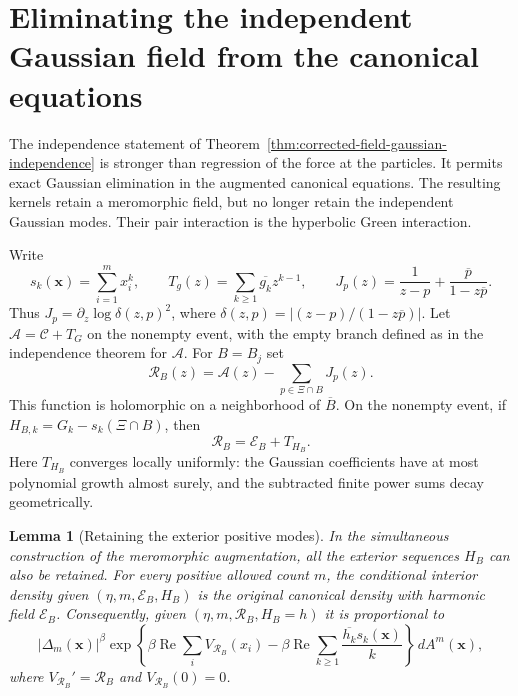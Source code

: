 \documentclass[11pt,a4paper]{article}
\numberwithin{equation}{section}
\newtheorem{lemma}[theorem]{Lemma}
\theoremstyle{definition}
\theoremstyle{remark}
\begin{document}
\section{Eliminating the independent Gaussian field from the canonical equations}
\label{sec:gaussian-elimination-green-specification}

The independence statement of
Theorem~\ref{thm:corrected-field-gaussian-independence} is stronger
than regression of the force at the particles. It permits exact Gaussian
elimination in the augmented canonical equations. The resulting kernels
retain a meromorphic field, but no longer retain the independent Gaussian
modes. Their pair interaction is the hyperbolic Green interaction.

Write
\[
 s_k(\mathbf x)=\sum_{i=1}^m x_i^k,\qquad
 T_g(z)=\sum_{k\ge1}\overline{g_k}z^{k-1},\qquad
 J_p(z)=\frac1{z-p}+\frac{\overline p}{1-z\overline p}.
\]
Thus $J_p=\partial_z\log\delta(z,p)^2$, where
$\delta(z,p)=|(z-p)/(1-z\overline p)|$.
Let $\mathcal A=\mathcal C+T_G$ on the nonempty event, with the empty
branch defined as in the independence theorem for $\mathcal A$.
For $B=B_j$ set
\begin{equation}\label{eq:gaussian-free-exterior-field}
 \mathcal R_B(z)=\mathcal A(z)-\sum_{p\in\Xi\cap B}J_p(z).
\end{equation}
This function is holomorphic on a neighborhood of $\overline B$.
On the nonempty event, if
$H_{B,k}=G_k-s_k(\Xi\cap B)$, then
\begin{equation}\label{eq:R-E-H-identity}
 \mathcal R_B=\mathcal E_B+T_{H_B}.
\end{equation}
Here $T_{H_B}$ converges locally uniformly: the Gaussian coefficients
have at most polynomial growth almost surely, and the subtracted finite
power sums decay geometrically.

\begin{lemma}[Retaining the exterior positive modes]
\label{lem:canonical-retain-exterior-positive-modes}
In the simultaneous construction of the meromorphic augmentation, all
the exterior sequences $H_B$ can also be retained. For every positive
allowed count $m$, the conditional interior density given
$(\eta,m,\mathcal E_B,H_B)$ is the original canonical density with
harmonic field $\mathcal E_B$. Consequently, given
$(\eta,m,\mathcal R_B,H_B=h)$ it is proportional to
\begin{equation}\label{eq:canonical-density-before-gaussian-elimination}
 |\Delta_m(\mathbf x)|^\beta
 \exp\left\{\beta\operatorname{Re}\sum_i V_{\mathcal R_B}(x_i)
       -\beta\operatorname{Re}
            \sum_{k\ge1}\frac{\overline{h_k}s_k(\mathbf x)}k\right\}
 \,dA^m(\mathbf x),
\end{equation}
where $V_{\mathcal R_B}'=\mathcal R_B$ and $V_{\mathcal R_B}(0)=0$.
\end{lemma}
\end{document}
